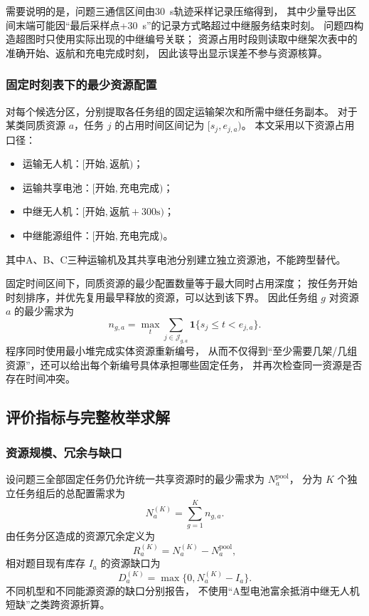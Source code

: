 需要说明的是，问题三通信区间由30~s轨迹采样记录压缩得到，
其中少量导出区间末端可能因“最后采样点+30~s”的记录方式略超过中继服务结束时刻。
问题四构造超图时只使用实际出现的中继编号关联；
资源占用时段则读取中继架次表中的准确开始、返航和充电完成时刻，
因此该导出显示误差不参与资源核算。

\subsubsection{固定时刻表下的最少资源配置}

对每个候选分区，分别提取各任务组的固定运输架次和所需中继任务副本。
对于某类同质资源 $a$，任务 $j$ 的占用时间区间记为 $[s_j,e_{j,a})$。
本文采用以下资源占用口径：
\begin{itemize}
	\item 运输无人机：$[\text{开始},\text{返航})$；
	\item 运输共享电池：$[\text{开始},\text{充电完成})$；
	\item 中继无人机：$[\text{开始},\text{返航}+300\text{s})$；
	\item 中继能源组件：$[\text{开始},\text{充电完成})$。
\end{itemize}
其中A、B、C三种运输机及其共享电池分别建立独立资源池，不能跨型替代。

固定时间区间下，同质资源的最少配置数量等于最大同时占用深度；
按任务开始时刻排序，并优先复用最早释放的资源，可以达到该下界\cite{q4-kleinberg2006}。
因此任务组 $g$ 对资源 $a$ 的最少需求为
\begin{equation}
	\boxed{
		n_{g,a}=\max_t\sum_{j\in\mathcal J_{g,a}}
		\mathbf 1\{s_j\le t<e_{j,a}\}
	}.
	\label{eq:q4-resource-depth}
\end{equation}
程序同时使用最小堆完成实体资源重新编号，
从而不仅得到“至少需要几架/几组资源”，还可以给出每个新编号具体承担哪些固定任务，
并再次检查同一资源是否存在时间冲突。

\subsection{评价指标与完整枚举求解}

\subsubsection{资源规模、冗余与缺口}

设问题三全部固定任务仍允许统一共享资源时的最少需求为 $N_a^{\mathrm{pool}}$，
分为 $K$ 个独立任务组后的总配置需求为
\begin{equation}
	N_a^{(K)}=\sum_{g=1}^{K}n_{g,a}.
	\label{eq:q4-total-resource}
\end{equation}
由任务分区造成的资源冗余定义为
\begin{equation}
	R_a^{(K)}=N_a^{(K)}-N_a^{\mathrm{pool}},
	\label{eq:q4-redundancy}
\end{equation}
相对题目现有库存 $I_a$ 的资源缺口为
\begin{equation}
	D_a^{(K)}=\max\{0,N_a^{(K)}-I_a\}.
	\label{eq:q4-shortage}
\end{equation}
不同机型和不同能源资源的缺口分别报告，
不使用“A型电池富余抵消中继无人机短缺”之类跨资源折算。

